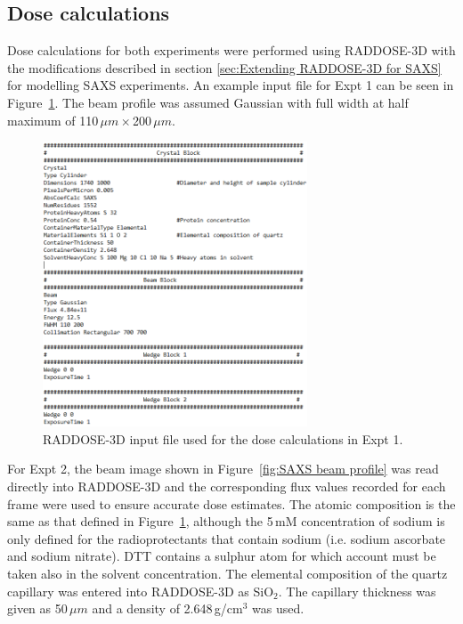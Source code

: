 \subsection{Dose calculations}
\label{sub:Dose calculation}
Dose calculations for both experiments were performed using RADDOSE-3D with the modifications described in section \ref{sec:Extending RADDOSE-3D for SAXS} for modelling SAXS experiments.
An example input file for Expt 1 can be seen in Figure~\ref{fig:SAXS example input - Rebecca}.
The beam profile was assumed Gaussian with full width at half maximum of 110$\,\mu m \times $200$\,\mu m$.
\begin{figure}
    \centering
    \includegraphics[width=0.7\textwidth]{figures/saxs/rebecca_raddose_input.png}
    \caption[RADDOSE-3D input file used for the dose calculations in Expt 1.]{RADDOSE-3D input file used for the dose calculations in Expt 1.}
    \label{fig:SAXS example input - Rebecca}
\end{figure}
For Expt 2, the beam image shown in Figure~\ref{fig:SAXS beam profile} was read directly into RADDOSE-3D and the corresponding flux values recorded for each frame were used to ensure accurate dose estimates.
The atomic composition is the same as that defined in Figure~\ref{fig:SAXS example input - Rebecca}, although the 5\,mM concentration of sodium is only defined for the radioprotectants that contain sodium (i.e. sodium ascorbate and sodium nitrate).
DTT contains a sulphur atom for which account must be taken also in the solvent concentration.
The elemental composition of the quartz capillary was entered into RADDOSE-3D as SiO$_{\text{2}}$.
The capillary thickness was given as 50$\,\mu m$ and a density of 2.648$\,$g/cm$^{\text{3}}$ was used.
